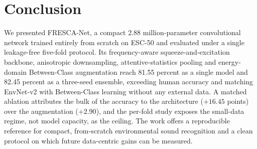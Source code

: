 \documentclass[conference]{IEEEtran}
\begin{document}
\section{Conclusion}
We presented FRESCA-Net, a compact 2.88 million-parameter convolutional network trained entirely from scratch on ESC-50 and evaluated under a single leakage-free five-fold protocol. Its frequency-aware squeeze-and-excitation backbone, anisotropic downsampling, attentive-statistics pooling and energy-domain Between-Class augmentation reach 81.55 percent as a single model and 82.45 percent as a three-seed ensemble, exceeding human accuracy and matching EnvNet-v2 with Between-Class learning without any external data. A matched ablation attributes the bulk of the accuracy to the architecture ($+16.45$ points) over the augmentation ($+2.90$), and the per-fold study exposes the small-data regime, not model capacity, as the ceiling. The work offers a reproducible reference for compact, from-scratch environmental sound recognition and a clean protocol on which future data-centric gains can be measured.
\end{document}
